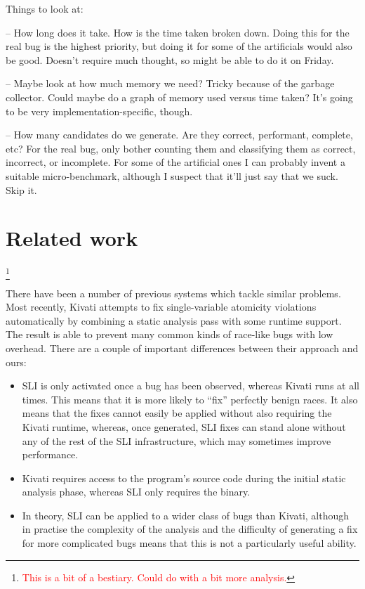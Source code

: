 \documentclass[10pt,twocolumn,preprint,natbib,authoryear]{sigplanconf}
\newcommand{\editorial}[1]{\textcolor{red}{\footnote{\textcolor{red}{#1}}}}
\begin{document}
Things to look at:

-- How long does it take.  How is the time taken broken down.  Doing
this for the real bug is the highest priority, but doing it for some
of the artificials would also be good.  Doesn't require much thought,
so might be able to do it on Friday.

-- Maybe look at how much memory we need?  Tricky because of the
garbage collector.  Could maybe do a graph of memory used versus time
taken?  It's going to be very implementation-specific, though.

-- How many candidates do we generate.  Are they correct, performant,
complete, etc?  For the real bug, only bother counting them and
classifying them as correct, incorrect, or incomplete.  For some of
the artificial ones I can probably invent a suitable micro-benchmark,
although I suspect that it'll just say that we suck.  Skip it.

\section{Related work}\editorial{This is a bit of a bestiary.  Could do with a bit more analysis.}

There have been a number of previous systems which tackle similar
problems.  Most recently, Kivati\cite{Chew2010a} attempts to fix
single-variable atomicity violations automatically by combining a
static analysis pass with some runtime support.  The result is able to
prevent many common kinds of race-like bugs with low overhead.  There
are a couple of important differences between their approach and ours:

\begin{itemize}
\item SLI is only activated once a bug has been observed, whereas
  Kivati runs at all times.  This means that it is more likely to
  ``fix'' perfectly benign races.  It also means that the fixes cannot
  easily be applied without also requiring the Kivati runtime,
  whereas, once generated, SLI fixes can stand alone without any of
  the rest of the SLI infrastructure, which may sometimes improve
  performance.

\item Kivati requires access to the program's source code during the
  initial static analysis phase, whereas SLI only requires the binary.

\item In theory, SLI can be applied to a wider class of bugs than
  Kivati, although in practise the complexity of the analysis and the
  difficulty of generating a fix for more complicated bugs means that
  this is not a particularly useful ability.
\end{itemize}
\end{document}
